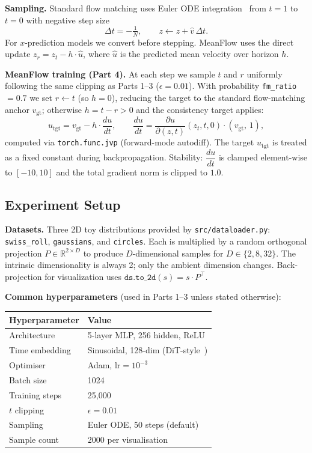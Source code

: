 \documentclass[11pt, a4paper]{article}
\begin{document}
\textbf{Sampling.} Standard flow matching uses Euler ODE integration~\cite{ma2024sit} from
$t=1$ to $t=0$ with negative step size \[
  \Delta t = -\tfrac{1}{N}, \qquad
  z \leftarrow z + \hat{v}\,\Delta t.
\]
For $x$-prediction models we convert before stepping. MeanFlow uses the direct
update \mbox{$z_r = z_t - h \cdot \hat{u}$}, where $\hat{u}$ is the predicted mean
velocity over horizon $h$.

\textbf{MeanFlow training (Part 4).} At each step we sample $t$ and $r$ 
uniformly following the same clipping as Parts 1--3 ($\epsilon = 0.01$).
With probability \texttt{fm\_ratio} $= 0.7$ we set $r \leftarrow t$
(so $h = 0$), reducing the target to the standard flow-matching anchor
$v_{\mathrm{gt}}$; otherwise $h = t - r > 0$ and the consistency target
applies:
\[
  u_{\mathrm{tgt}} = v_{\mathrm{gt}} - h \cdot \frac{du}{dt},
  \qquad
  \frac{du}{dt} = \frac{\partial u}{\partial (z,t)}(z_t, t, 0)\cdot(v_{\mathrm{gt}},\,1),
\]
computed via \texttt{torch.func.jvp} (forward-mode autodiff).
The target $u_{\text{tgt}}$ is treated as a fixed constant during
backpropagation.
Stability: $\dfrac{du}{dt}$ is clamped element-wise to $[-10, 10]$ and the
total gradient norm is clipped to $1.0$.

\subsection*{Experiment Setup}

\textbf{Datasets.} Three 2D toy distributions provided by
\texttt{src/dataloader.py}: \texttt{swiss\_roll}, \texttt{gaussians},
and \texttt{circles}. Each is multiplied by a random orthogonal projection
$P \in \mathbb{R}^{2 \times D}$ to produce $D$-dimensional samples for
$D \in \{2, 8, 32\}$. The intrinsic dimensionality is always 2; only the
ambient dimension changes. Back-projection for visualization uses
$\texttt{ds.to\_2d}(s) = s \cdot P^{\top}$.

\textbf{Common hyperparameters} (used in Parts 1--3 unless stated otherwise):
\begin{center}
\begin{tabular}{ll}
  \toprule
  Hyperparameter & Value \\
  \midrule
  Architecture       & 5-layer MLP, 256 hidden, ReLU \\
  Time embedding     & Sinusoidal, 128-dim (DiT-style~\cite{peebles2023dit}) \\
  Optimiser          & Adam, $\mathrm{lr} = 10^{-3}$ \\
  Batch size         & 1024 \\
  Training steps     & 25{,}000 \\
  $t$ clipping       & $\epsilon = 0.01$ \\
  Sampling           & Euler ODE, 50 steps (default) \\
  Sample count       & 2000 per visualisation \\
  \bottomrule
\end{tabular}
\end{center}
\end{document}
